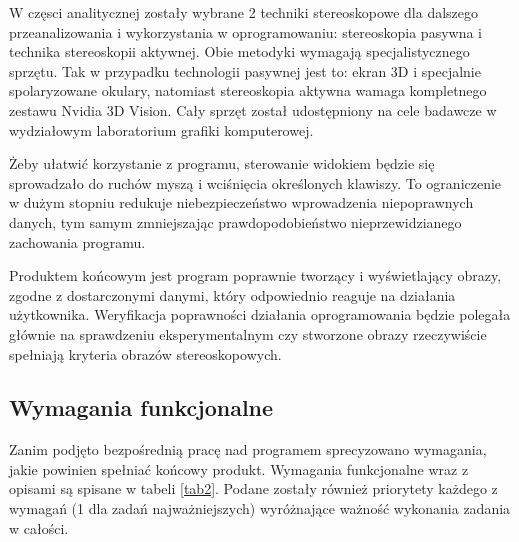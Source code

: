 W częsci analitycznej zostały wybrane 2 techniki stereoskopowe dla dalszego przeanalizowania i wykorzystania w oprogramowaniu: stereoskopia pasywna i technika stereoskopii aktywnej. Obie metodyki wymagają specjalistycznego sprzętu. Tak w przypadku technologii pasywnej jest to: ekran 3D i specjalnie spolaryzowane okulary, natomiast stereoskopia aktywna wamaga kompletnego zestawu Nvidia 3D Vision. Cały sprzęt został udostępniony na cele badawcze w wydziałowym laboratorium grafiki komputerowej.

Żeby ułatwić korzystanie z programu, sterowanie widokiem będzie się sprowadzało do ruchów myszą i wciśnięcia określonych klawiszy. To ograniczenie w dużym stopniu redukuje niebezpieczeństwo wprowadzenia niepoprawnych danych, tym samym zmniejszając prawdopodobieństwo nieprzewidzianego zachowania programu.

Produktem końcowym jest program poprawnie tworzący i wyświetlający obrazy, zgodne z dostarczonymi danymi, który odpowiednio reaguje na działania użytkownika. Weryfikacja poprawności działania oprogramowania będzie polegała głównie na sprawdzeniu eksperymentalnym czy stworzone obrazy rzeczywiście spełniają kryteria obrazów stereoskopowych. 

\subsection{Wymagania funkcjonalne}
Zanim podjęto bezpośrednią pracę nad programem sprecyzowano wymagania, jakie powinien spełniać końcowy produkt. Wymagania funkcjonalne wraz z opisami są spisane w tabeli \ref{tab2}. Podane zostały również priorytety każdego z wymagań (1 dla zadań najważniejszych) wyróżnające ważność wykonania zadania w całości. 

